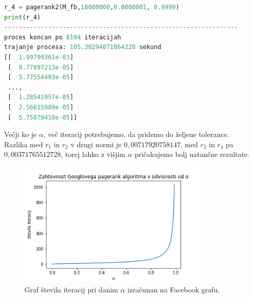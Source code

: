 \documentclass[a4paper]{article}
\begin{document}
\begin{lstlisting}[language=Python]
r_4 = pagerank2(M_fb,10000000,0.0000001, 0.9999)
print(r_4)
----------------------------------------------------------------
proces koncan po 8104 iteracijah
trajanje procesa: 105.30294071864228 sekund
[[  1.99799361e-03]
 [  9.77897213e-05]
 [  5.77554403e-05]
 ..., 
 [  1.28541957e-05]
 [  2.56615989e-05]
 [  5.75079410e-05]]
\end{lstlisting}

Večji ko je $\alpha$, več iteracij potrebujemo, da pridemo do željene tolerance. \\
Razlika med $r_1$ in $r_2$ v drugi normi je $0,00717920758147$, med $r_2$ in $r_4$ pa $0,00371765512728$, torej lahko z višjim $\alpha$ pričakujemo bolj natančne rezultate.  
\begin{figure}[h]
\begin{center} 
\includegraphics[width=9cm]{Pagerank_alpha.png}
\caption[Zahtevnost Googlovega pagerank algoritma glede na $\alpha$]{Graf števila iteracij pri danim $\alpha$ izračunan na Facebook grafu.}
\end{center}
\end{figure}

\newpage
\end{document}
